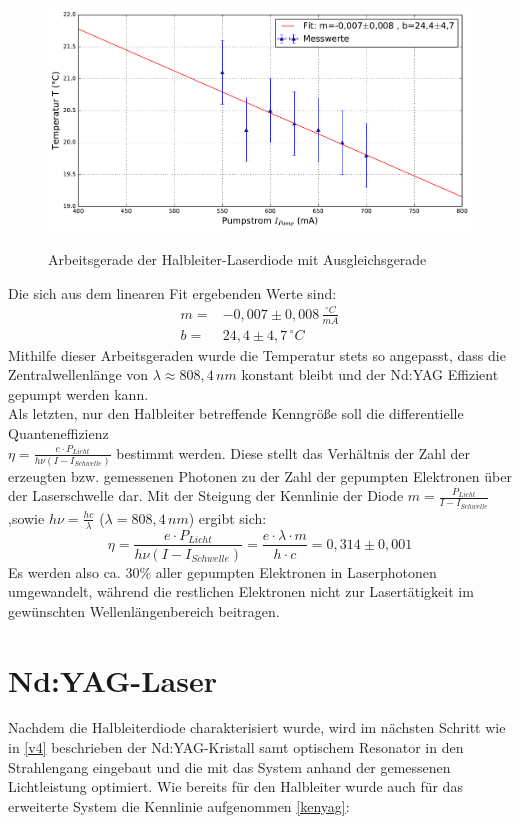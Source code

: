 \documentclass[twoside,colorback,accentcolor=tud4c,11pt]{tudreport}
\begin{document}
\begin{figure}[H]
\centering
   	\begin{minipage}[b]{0.9\textwidth}
   	\includegraphics[width=\textwidth]{graphics/arbeitsgerade_hld.pdf}
  	\label{ad}
   	\end{minipage}
\caption{Arbeitsgerade der Halbleiter-Laserdiode mit Ausgleichsgerade}	
\end{figure}
Die sich aus dem linearen Fit ergebenden Werte sind:
\begin{align}
m=&-0,007 \pm 0,008\,\si{\frac{^{\circ} C}{mA}}\\
b=&24,4 \pm 4,7\,\si{^{\circ} C}
\end{align}
Mithilfe dieser Arbeitsgeraden wurde die Temperatur stets so angepasst, dass die Zentralwellenlänge von $\lambda\approx 808,4\,\si{nm}$ konstant bleibt und der Nd:YAG Effizient gepumpt werden kann.\\
Als letzten, nur den Halbleiter betreffende Kenngröße soll die differentielle Quanteneffizienz\\ $\eta=\frac{e\cdot P_{Licht}}{h\nu (I-I_{Schwelle})}$ bestimmt werden. Diese stellt das Verhältnis der Zahl der erzeugten bzw. gemessenen Photonen zu der Zahl der gepumpten Elektronen über der Laserschwelle dar. Mit der Steigung der Kennlinie der Diode $m=\frac{P_{Licht}}{I-I_{Schwelle}}$,sowie $h\nu=\frac{hc}{\lambda}$ ($\lambda=808,4\,\si{nm}$) ergibt sich:
\begin{equation}
\eta=\frac{e\cdot P_{Licht}}{h\nu (I-I_{Schwelle})}=\frac{e\cdot\lambda\cdot m}{h\cdot c}=0,314 \pm 0,001
\end{equation}
Es werden also ca. $30\%$ aller gepumpten Elektronen in Laserphotonen umgewandelt, während die restlichen Elektronen nicht zur Lasertätigkeit im gewünschten Wellenlängenbereich beitragen.
\newpage
\section{Nd:YAG-Laser}
Nachdem die Halbleiterdiode charakterisiert wurde, wird im nächsten Schritt wie in \ref{v4} beschrieben der Nd:YAG-Kristall samt optischem Resonator in den Strahlengang eingebaut und die mit das System anhand der gemessenen Lichtleistung optimiert. Wie bereits für den Halbleiter wurde auch für das erweiterte System die Kennlinie aufgenommen \ref{kenyag}:
\end{document}
